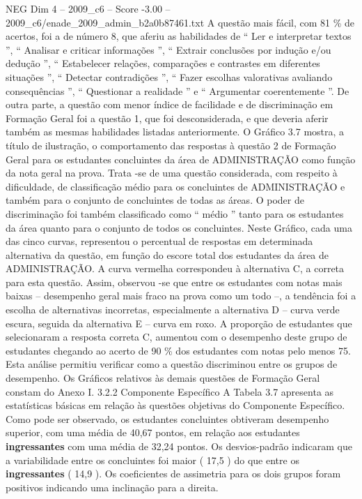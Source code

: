\begin{textsample}{NEG Dim 4 – 2009\_c6 – Score -3.00 – 2009\_c6/enade\_2009\_admin\_b2a0b87461.txt}
A questão mais fácil, com 81 \% de acertos, foi a de número 8, que aferiu as habilidades de “ Ler e interpretar textos ”, “ Analisar e criticar informações ”, “ Extrair conclusões por indução e/ou dedução ”, “ Estabelecer relações, comparações e contrastes em diferentes situações ”, “ Detectar contradições ”, “ Fazer escolhas valorativas avaliando consequências ”, “ Questionar a realidade ” e “ Argumentar coerentemente ”.
De outra parte, a questão com menor índice de facilidade e de discriminação em Formação Geral foi a questão 1, que foi desconsiderada, e que deveria aferir também as mesmas habilidades listadas anteriormente.
O Gráfico 3.7 mostra, a título de ilustração, o comportamento das respostas à questão 2 de Formação Geral para os estudantes concluintes da área de ADMINISTRAÇÃO como função da nota geral na prova.
Trata -se de uma questão considerada, com respeito à dificuldade, de classificação médio para os concluintes de ADMINISTRAÇÃO e também para o conjunto de concluintes de todas as áreas.
O poder de discriminação foi também classificado como “ médio ” tanto para os estudantes da área quanto para o conjunto de todos os concluintes.
Neste Gráfico, cada uma das cinco curvas, representou o percentual de respostas em determinada alternativa da questão, em função do escore total dos estudantes da área de ADMINISTRAÇÃO.
A curva vermelha correspondeu à alternativa C, a correta para esta questão.
Assim, observou -se que entre os estudantes com notas mais baixas – desempenho geral mais fraco na prova como um todo –, a tendência foi a escolha de alternativas incorretas, especialmente a alternativa D – curva verde escura, seguida da alternativa E – curva em roxo.
A proporção de estudantes que selecionaram a resposta correta C, aumentou com o desempenho deste grupo de estudantes chegando ao acerto de 90 \% dos estudantes com notas pelo menos 75.
Esta análise permitiu verificar como a questão discriminou entre os grupos de desempenho.
Os Gráficos relativos às demais questões de Formação Geral constam do Anexo I. 3.2.2 Componente Específico A Tabela 3.7 apresenta as estatísticas básicas em relação às questões objetivas do Componente Específico.
Como pode ser observado, os estudantes concluintes obtiveram desempenho superior, com uma média de 40,67 pontos, em relação aos estudantes \textbf{ingressantes} com uma média de 32,24 pontos.
Os desvios-padrão indicaram que a variabilidade entre os concluintes foi maior ( 17,5 ) do que entre os \textbf{ingressantes} ( 14,9 ).
Os coeficientes de assimetria para os dois grupos foram positivos indicando uma inclinação para a direita.

\end{textsample}
